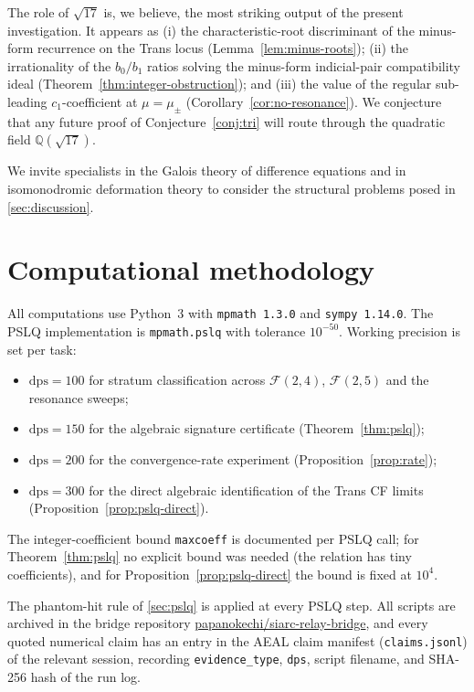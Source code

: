\documentclass[11pt]{amsart}
\theoremstyle{definition}
\theoremstyle{remark}
\newcommand{\FF}{\mathcal{F}}
\newcommand{\dps}{\mathrm{dps}}
\newcommand{\Q}{\mathbb{Q}}
\begin{document}
The role of $\sqrt{17}$ is, we believe, the most striking output of
the present investigation.  It appears as (i) the characteristic-root
discriminant of the minus-form recurrence on the Trans locus
(Lemma~\ref{lem:minus-roots}); (ii) the irrationality of the
$b_0/b_1$ ratios solving the minus-form indicial-pair compatibility
ideal (Theorem~\ref{thm:integer-obstruction}); and (iii) the value
of the regular sub-leading $c_1$-coefficient at $\mu = \mu_\pm$
(Corollary~\ref{cor:no-resonance}).  We conjecture that any future
proof of Conjecture~\ref{conj:tri} will route through the quadratic
field $\Q(\sqrt{17})$.

We invite specialists in the Galois theory of difference equations
and in isomonodromic deformation theory to consider the structural
problems posed in \textsection\ref{sec:discussion}.

\appendix
\section{Computational methodology}\label{app:methods}

All computations use Python~3 with \texttt{mpmath~1.3.0} and
\texttt{sympy~1.14.0}.  The PSLQ implementation is
\texttt{mpmath.pslq} with tolerance $10^{-50}$.  Working precision is
set per task:
\begin{itemize}[leftmargin=1.4em]
\item $\dps = 100$ for stratum classification across $\FF(2,4)$,
$\FF(2,5)$ and the resonance sweeps;
\item $\dps = 150$ for the algebraic signature certificate
(Theorem~\ref{thm:pslq});
\item $\dps = 200$ for the convergence-rate experiment
(Proposition~\ref{prop:rate});
\item $\dps = 300$ for the direct algebraic identification of the
Trans CF limits (Proposition~\ref{prop:pslq-direct}).
\end{itemize}
The integer-coefficient bound \texttt{maxcoeff} is documented per
PSLQ call; for Theorem~\ref{thm:pslq} no explicit bound was needed
(the relation has tiny coefficients), and for
Proposition~\ref{prop:pslq-direct} the bound is fixed at $10^{4}$.

The phantom-hit rule of \textsection\ref{sec:pslq} is applied at
every PSLQ step.  All scripts are archived in the bridge repository
\href{https://github.com/papanokechi/siarc-relay-bridge}%
{papanokechi/siarc-relay-bridge}, and every quoted numerical claim
has an entry in the AEAL claim manifest (\texttt{claims.jsonl}) of
the relevant session, recording \texttt{evidence\_type}, \texttt{dps},
script filename, and SHA-256 hash of the run log.
\end{document}
